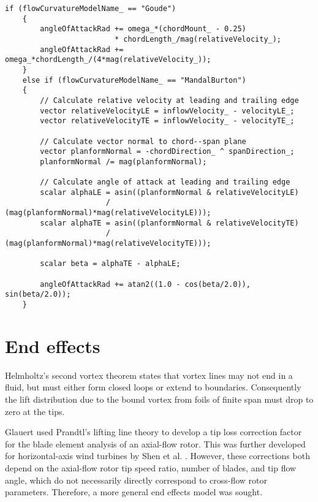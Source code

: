 \begin{lstlisting}[float,caption=Flow curvature model implementation.,label=lst:flow-curvature]
    if (flowCurvatureModelName_ == "Goude")
    {
        angleOfAttackRad += omega_*(chordMount_ - 0.25)
                         * chordLength_/mag(relativeVelocity_);
        angleOfAttackRad += omega_*chordLength_/(4*mag(relativeVelocity_));
    }
    else if (flowCurvatureModelName_ == "MandalBurton")
    {
        // Calculate relative velocity at leading and trailing edge
        vector relativeVelocityLE = inflowVelocity_ - velocityLE_;
        vector relativeVelocityTE = inflowVelocity_ - velocityTE_;
    
        // Calculate vector normal to chord--span plane
        vector planformNormal = -chordDirection_ ^ spanDirection_;
        planformNormal /= mag(planformNormal);
        
        // Calculate angle of attack at leading and trailing edge
        scalar alphaLE = asin((planformNormal & relativeVelocityLE)
                       / (mag(planformNormal)*mag(relativeVelocityLE)));
        scalar alphaTE = asin((planformNormal & relativeVelocityTE)
                       / (mag(planformNormal)*mag(relativeVelocityTE)));
        
        scalar beta = alphaTE - alphaLE;
        
        angleOfAttackRad += atan2((1.0 - cos(beta/2.0)), sin(beta/2.0));
    }
\end{lstlisting}


\section{End effects}

Helmholtz's second vortex theorem states that vortex lines may not end in a
fluid, but must either form closed loops or extend to boundaries. Consequently
the lift distribution due to the bound vortex from foils of finite span must
drop to zero at the tips.

Glauert used Prandtl's lifting line theory to develop a tip loss correction
factor for the blade element analysis of an axial-flow rotor. This was further
developed for horizontal-axis wind turbines by Shen et al. \cite{Shen2005a}.
However, these corrections both depend on the axial-flow rotor tip speed ratio,
number of blades, and tip flow angle, which do not necessarily directly
correspond to cross-flow rotor parameters. Therefore, a more general end effects
model was sought.

